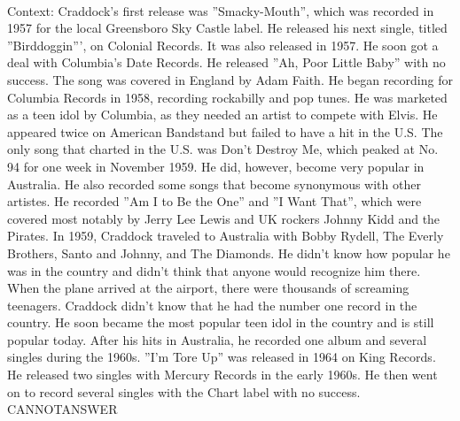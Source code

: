 \documentclass[11pt,a4paper, onecolumn]{article}
\begin{document}
\\ Context: Craddock's first release was ''Smacky-Mouth'', which was recorded in 1957 for the local Greensboro Sky Castle label. He released his next single, titled ''Birddoggin''', on Colonial Records. It was also released in 1957. He soon got a deal with Columbia's Date Records. He released ''Ah, Poor Little Baby'' with no success. The song was covered in England by Adam Faith. He began recording for Columbia Records in 1958, recording rockabilly and pop tunes. He was marketed as a teen idol by Columbia, as they needed an artist to compete with Elvis. He appeared twice on American Bandstand but failed to have a hit in the U.S. The only song that charted in the U.S. was Don't Destroy Me, which peaked at No. 94 for one week in November 1959. He did, however, become very popular in Australia. He also recorded some songs that become synonymous with other artistes. He recorded ''Am I to Be the One'' and ''I Want That'', which were covered most notably by Jerry Lee Lewis and UK rockers Johnny Kidd and the Pirates. In 1959, Craddock traveled to Australia with Bobby Rydell, The Everly Brothers, Santo and Johnny, and The Diamonds. He didn't know how popular he was in the country and didn't think that anyone would recognize him there. When the plane arrived at the airport, there were thousands of screaming teenagers. Craddock didn't know that he had the number one record in the country. He soon became the most popular teen idol in the country and is still popular today. After his hits in Australia, he recorded one album and several singles during the 1960s. ''I'm Tore Up'' was released in 1964 on King Records. He released two singles with Mercury Records in the early 1960s. He then went on to record several singles with the Chart label with no success. CANNOTANSWER
\end{document}

